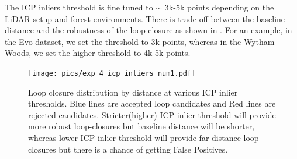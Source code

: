  The ICP inliers threshold is fine tuned to $\sim$ 3k-5k points depending on the LiDAR setup and forest environments. There is trade-off between the baseline distance and the robustness of the loop-closure as shown in . For an example, in the Evo dataset, we set the threshold to 3k points, whereas in the Wytham Woods, we set the higher threshold to 4k-5k points. 
 \begin{figure}[t]
  \centering
  \texttt{[image: pics/exp\_4\_icp\_inliers\_num1.pdf]}
  \caption{Loop closure distribution by distance at various ICP inlier thresholds. Blue lines are accepted loop candidates and Red lines are rejected candidates. Stricter(higher) ICP inlier threshold will provide more robust loop-closures but baseline distance will be shorter, whereas lower ICP inlier threshold will provide far distance loop-closures but there is a chance of getting False Positives.}
  \label{fig:icp_inliers_num}
\end{figure}
